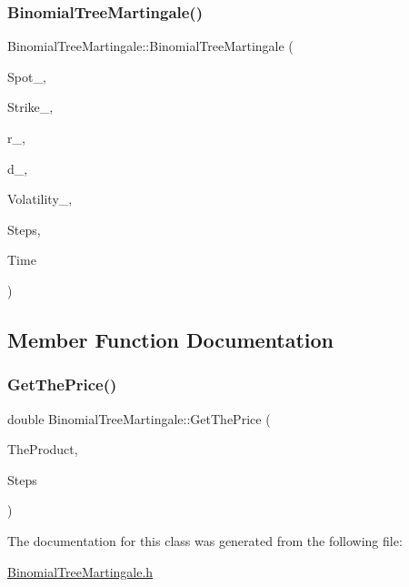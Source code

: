 \subsubsection{\texorpdfstring{Binomial\+Tree\+Martingale()}{BinomialTreeMartingale()}}
{\footnotesize\ttfamily Binomial\+Tree\+Martingale\+::\+Binomial\+Tree\+Martingale (\begin{DoxyParamCaption}\item[{double}]{Spot\+\_\+,  }\item[{double}]{Strike\+\_\+,  }\item[{const \hyperlink{classParameters}{Parameters} \&}]{r\+\_\+,  }\item[{const \hyperlink{classParameters}{Parameters} \&}]{d\+\_\+,  }\item[{double}]{Volatility\+\_\+,  }\item[{unsigned long}]{Steps,  }\item[{double}]{Time }\end{DoxyParamCaption})}



\subsection{Member Function Documentation}
\hypertarget{classBinomialTreeMartingale_a9cc63624311a9f63664fd08aa78533f9}{}\label{classBinomialTreeMartingale_a9cc63624311a9f63664fd08aa78533f9} 
\subsubsection{\texorpdfstring{Get\+The\+Price()}{GetThePrice()}}
{\footnotesize\ttfamily double Binomial\+Tree\+Martingale\+::\+Get\+The\+Price (\begin{DoxyParamCaption}\item[{const \hyperlink{classTreeProduct}{Tree\+Product} \&}]{The\+Product,  }\item[{unsigned long}]{Steps }\end{DoxyParamCaption})}



The documentation for this class was generated from the following file\+:\begin{DoxyCompactItemize}
\item 
\hyperlink{BinomialTreeMartingale_8h}{Binomial\+Tree\+Martingale.\+h}\end{DoxyCompactItemize}
